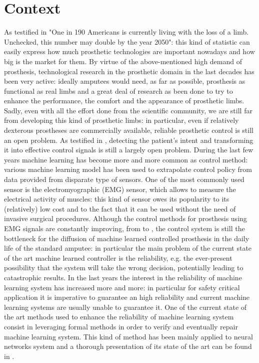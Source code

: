 \section{Context}\label{s:context}
As testified in \cite{ZIEGLERGRAHAM2008422} "One in 190 Americans is currently living with the loss of a limb. Unchecked, this number may double by the year 2050": this kind of statistic can easily express how much prosthetic technologies are important nowadays and how big is the market for them.
By virtue of the above-mentioned high demand of prosthesis, technological research in the prosthetic domain in the last decades has been very active: ideally amputees would need, as far as possible, prosthesis as functional as real limbs and a great deal of research as been done to try to enhance the performance, the comfort and the appearance of prosthetic limbs. Sadly, even with all the effort done from the scientific community, we are still far from developing this kind of prosthetic limbs: in particular, even if relatively dexterous prostheses are commercially available, reliable prosthetic control is still an open problem. As testified in \cite{castellini2016upper}, detecting the patient's intent and transforming it into effective control signals is still a largely open problem. During the last few years machine learning has become more and more common as control method: various machine learning model has been used to extrapolate control policy from data provided from disparate type of sensors.
One of the most commonly used sensor is the electromyographic (EMG) sensor, which allows to measure the electrical activity of muscles: this kind of sensor owes its popularity to its (relatively) low cost and to the fact that it can be used without the need of invasive surgical procedures. Although the control methods for prosthesis using EMG signals are constantly improving, from \cite{Zecca2002} to \cite{Strazzulla2017}, the control system is still the bottleneck for the diffusion of machine learned controlled prosthesis in the daily life of the standard amputee: in particular the main problem of the current state of the art machine learned controller is the reliability, e.g. the ever-present possibility that the system will take the wrong decision, potentially leading to catastrophic results.
In the last years the interest in the reliability of machine learning system has increased more and more: in particular for safety critical application it is imperative to guarantee an high reliability and current machine learning systems are usually unable to guarantee it. One of the current state of the art methods used to enhance the reliability of machine learning system consist in leveraging formal methods in order to verify and eventually repair machine learning system. This kind of method has been mainly applied to neural networks system and a thorough presentation of its state of the art can be found in \cite{leofante2018automated}.